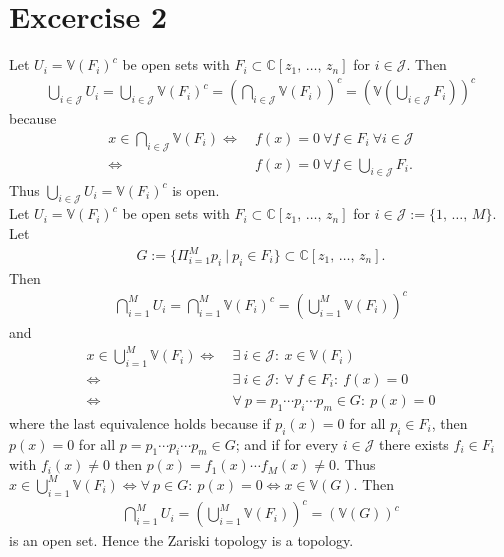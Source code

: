 \documentclass{article}
\begin{document}
\section*{Excercise 2}
\label{sec:Ex2}
Let $U_{i} = \mathbb{V}(F_{i})^{c}$ be open sets with $F_{i} \subset \mathbb{C}\left[z_{1} ,\, \dots ,\, z_{n}\right]$ for $i \in \mathcal{J}$.
Then
\begin{align*}
 \bigcup_{i \in \mathcal{J}} U_{i} = \bigcup_{i \in \mathcal{J}} \mathbb{V}(F_{i})^{c} = \left(\bigcap_{i \in \mathcal{J}} \mathbb{V}(F_{i})\right)^{c} = \left( \mathbb{V} \left( \bigcup_{i \in \mathcal{J}} F_{i} \right)\right)^{c}
\end{align*}
because
\begin{align*}
  x \in \bigcap_{i \in \mathcal{J}} \mathbb{V}(F_{i})
  \Leftrightarrow \ & f(x) = 0 \ \forall f \in F_{i} \ \forall i \in \mathcal{J} \\
  \Leftrightarrow \ & f(x) = 0 \ \forall f \in \bigcup_{i \in \mathcal{J}} F_{i}.  
\end{align*}
Thus $\bigcup_{i \in \mathcal{J}}U_{i} = \mathbb{V}(F_{i})^{c}$ is open.\\
Let $U_{i} = \mathbb{V}(F_{i})^{c}$ be open sets with $F_{i} \subset \mathbb{C}\left[z_{1} ,\, \dots ,\, z_{n}\right]$ for $i \in \mathcal{J} := \{ 1 ,\, \dots ,\, M\}$.
Let
\begin{align*}
 G := \{ \Pi_{i = 1}^{M} p_{i} \ | \ p_{i} \in F_{i}\} \subset \mathbb{C}\left[z_{1} ,\, \dots ,\, z_{n}\right].
\end{align*}
Then
\begin{align*}
  \bigcap_{i=1}^{M} U_{i} = \bigcap_{i=1}^{M} \mathbb{V}(F_{i})^{c} =  \left(\bigcup_{i=1}^{M} \mathbb{V}(F_{i})\right)^{c}
\end{align*}
and
\begin{align*}
  x \in \bigcup_{i=1}^{M} \mathbb{V}(F_{i})
  \Leftrightarrow \ & \exists \ i \in \mathcal{J}: \ x \in \mathbb{V}(F_{i}) \\
  \Leftrightarrow \ & \exists \ i \in \mathcal{J}: \ \forall \ f \in F_{i}: \ f(x) = 0 \\
  \Leftrightarrow \ & \forall \ p = p_{1} \cdots p_{i} \cdots p_{m} \in G: \ p(x) = 0
\end{align*}
where the last equivalence holds because if $p_{i}(x) = 0$ for all $p_{i} \in F_{i}$, then $p(x) = 0$ for all $p = p_{1} \cdots p_{i} \cdots p_{m}\in G$; and if for every $i \in \mathcal{J}$ there exists $f_{i} \in F_{i}$ with $f_{i}(x) \neq 0$ then $p(x) = f_{1}(x) \cdots f_{M}(x) \neq 0$.
Thus $x \in \bigcup_{i=1}^{M} \mathbb{V}(F_{i}) \Leftrightarrow \forall \ p \in G: \ p(x) = 0 \Leftrightarrow x \in \mathbb{V}(G)$.
Then
\begin{align*}
  \bigcap_{i=1}^{M} U_{i} = \left(\bigcup_{i=1}^{M} \mathbb{V}(F_{i})\right)^{c} = \left(\mathbb{V}(G)\right)^{c}
\end{align*}
is an open set.
Hence the Zariski topology is a topology.
\end{document}
